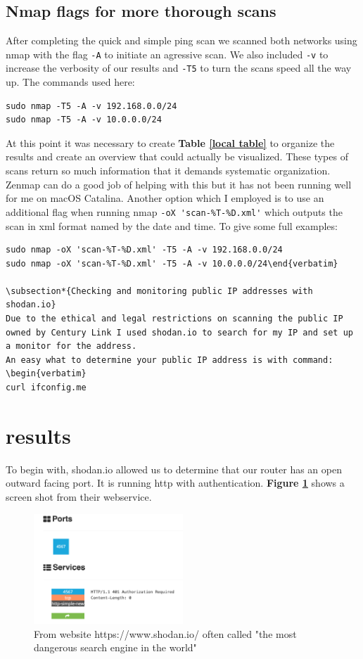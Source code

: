 \documentclass[10pt]{article}
\begin{document}
\subsection*{Nmap flags for more thorough scans}
After completing the quick and simple ping scan we scanned both networks using nmap with the flag \verb|-A| to initiate an agressive scan. We also included \verb|-v| to increase the 
verbosity of our results and \verb|-T5| to turn the scans speed all the way up. The commands used here:
\begin{verbatim}
sudo nmap -T5 -A -v 192.168.0.0/24
sudo nmap -T5 -A -v 10.0.0.0/24\end{verbatim}
At this point it was necessary to create \textbf{Table \ref{local table}} to organize the results and create an overview that could actually be visualized. These 
types of scans return so much information that it demands systematic organization. Zenmap can do a good job of helping with this but it has not been running
well for me on macOS Catalina. Another option which I employed is to use an additional flag when running nmap \verb|-oX 'scan-%T-%D.xml'| which outputs the
scan in xml format named by the date and time. To give some full examples:
\begin{verbatim}
sudo nmap -oX 'scan-%T-%D.xml' -T5 -A -v 192.168.0.0/24
sudo nmap -oX 'scan-%T-%D.xml' -T5 -A -v 10.0.0.0/24\end{verbatim}

\subsection*{Checking and monitoring public IP addresses with shodan.io}
Due to the ethical and legal restrictions on scanning the public IP owned by Century Link I used shodan.io to search for my IP and set up a monitor for the address.
An easy what to determine your public IP address is with command:
\begin{verbatim}
curl ifconfig.me
\end{verbatim}

\section*{results}
To begin with, shodan.io allowed us to determine that our router has an open outward facing port. It is running http with authentication. \textbf{Figure \ref{shodan image}} 
shows a screen shot from their webservice.

\begin{figure}[H]
\centering
\includegraphics[width=0.5\textwidth]{shodan.png}
\caption{From website https://www.shodan.io/ often called "the most dangerous search engine in the world"}\label{shodan image}
\end{figure}
\end{document}
